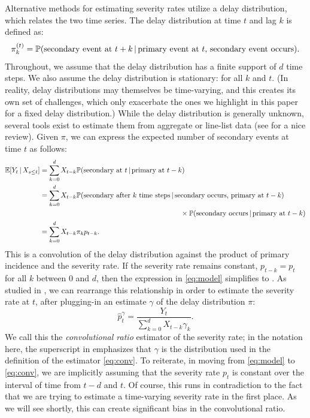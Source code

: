 \documentclass{article}
\renewcommand{\hat}{\widehat} %
\newcommand{\given}{\, \vert \,}
\begin{document}
Alternative methods for estimating severity rates utilize a delay distribution,
which relates the two time series. The delay distribution at time $t$ and lag
$k$ is defined as: 
\[
\pi_k^{(t)} = \P(\text{secondary event at $t+k$} \given \text{primary event at
  $t$, secondary event occurs}).  
\]
Throughout, we assume that the delay distribution has a finite support
of $d$ time steps. We also assume the delay distribution is stationary:
 for all $k$ and $t$. (In reality, delay
distributions may themselves be time-varying, and this creates its own set of
challenges, which only exacerbate the ones we highlight in this paper for a
fixed delay distribution.) While the delay distribution is generally unknown,
several tools exist to estimate them from aggregate or line-list data (see
\citealp{delay_distrs} for a nice review). Given $\pi$, we can express the
expected number of secondary events at time $t$ as follows: 
\begin{align}
\E[Y_t \given X_{s\leq t}]
&= \sum_{k=0}^d X_{t-k} \P(\text{secondary at $t$} \given \text{primary at
  $t-k$}) \nonumber \\   
&= \sum_{k=0}^d X_{t-k} \P(\text{secondary after $k$ time steps} \given
  \text{secondary occurs, primary at $t-k$}) \nonumber \\
&\hspace{200pt} \times\P(\text{secondary occurs} \given\text{primary at $t-k$})
  \nonumber \\  
\label{eq:model}
&= \sum_{k=0}^d X_{t-k} \pi_k p_{t-k}.
\end{align}
This is a convolution of the delay distribution against the product of primary
incidence and the severity rate. If the severity rate remains constant, $p_{t-k}
= p_t$ for all $k$ between $0$ and $d$, then the expression in \eqref{eq:model}
simplifies to \smash{$\E[Y_t \given X_{s\leq t}] = p_t \sum_{k=0}^d X_{t-k}
  \pi_k$}. As studied in \citet{UKpaper}, we can rearrange this relationship in 
order to estimate the severity rate at $t$, after plugging-in an estimate
$\gamma$ of the delay distribution $\pi$:   
\begin{equation}
\label{eq:conv}
\hat{p}_t^\gamma = \frac{Y_t}{\sum_{k=0}^d X_{t-k} \gamma_k}.
\end{equation}
We call this the \emph{convolutional ratio} estimator of the severity rate; in
the notation here, the superscript in \smash{$\hat{p}_t^\gamma$} emphasizes that
$\gamma$ is the distribution used in the definition of the estimator
\eqref{eq:conv}. To reiterate, in moving from \eqref{eq:model} to
\eqref{eq:conv}, we are implicitly assuming that the severity rate $p_t$ is
constant over the interval of time from $t-d$ and $t$. Of course, this runs in
contradiction to the fact that we are trying to estimate a time-varying severity
rate in the first place. As we will see shortly, this can create significant
bias in the convolutional ratio.  
\end{document}
